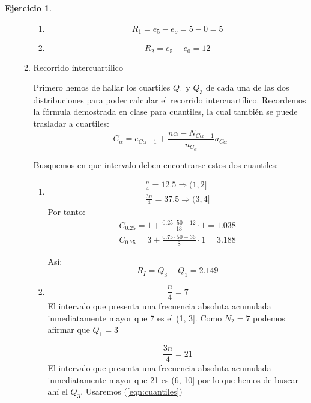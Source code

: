 \documentclass[a4paper, 12pt]{article}
\theoremstyle{definition}
\newtheorem{ej}{Ejercicio}
\begin{document}
\begin{ej}
\begin{enumerate}[label=\textit{\alph*)}]
\begin{enumerate}[label=\arabic*)]
    \begin{enumerate}[label=(\arabic*)]
        \item 
        \[
        R_1 = e_5 - e_o = 5 - 0 = 5
        \]
        
        \item
        \[
        R_2 = e_5 - e_0 = 12
        \]
    \end{enumerate}
    
    \item Recorrido intercuartílico
    
    Primero hemos de hallar los cuartiles \(Q_1\) y \(Q_3\) de cada una de las dos distribuciones para poder calcular el recorrido intercuartílico. Recordemos la fórmula demostrada en clase para cuantiles, la cual también se puede trasladar a cuartiles:
    \begin{equation}\label{eqn:cuantiles}
        C_\alpha = e_{C\alpha - 1} + \frac{n\alpha - N_{C\alpha - 1}}{n_{C_\alpha}}a_{C\alpha}
    \end{equation}
    
    Busquemos en que intervalo deben encontrarse estos dos cuantiles:
    \begin{enumerate}[label=(\arabic*)]
        \item 

    \begin{align*}
    \frac{n}{4} = 12.5 \Rightarrow (1,2] \\
    \frac{3n}{4} = 37.5 \Rightarrow (3,4]
    \end{align*}
    Por tanto:
    \begin{align*}
        C_{0.25} = 1 + \frac{0.25 \cdot 50 - 12}{13} \cdot 1 = 1.038 \\
        C_{0.75} = 3 + \frac{0.75 \cdot 50 - 36}{8} \cdot 1 = 3.188
    \end{align*}
    
    Así:
    \[
    R_I = Q_3 - Q_1 = 2.149
    \]
    
    \item
    
    \[
    \frac{n}{4} = 7
    \]
    El intervalo que presenta una frecuencia absoluta acumulada inmediatamente mayor que 7 es el (1, 3]. Como \(N_2 = 7\) podemos afirmar que \(Q_1 = 3\)
    
    \[
    \frac{3n}{4} = 21
    \]
    El intervalo que presenta una frecuencia absoluta acumulada inmediatamente mayor que 21 es (6, 10] por lo que hemos de buscar ahí el \(Q_3\). Usaremos (\ref{eqn:cuantiles})
    

\end{enumerate}
\end{enumerate}
\end{enumerate}
\end{ej}
\end{document}
